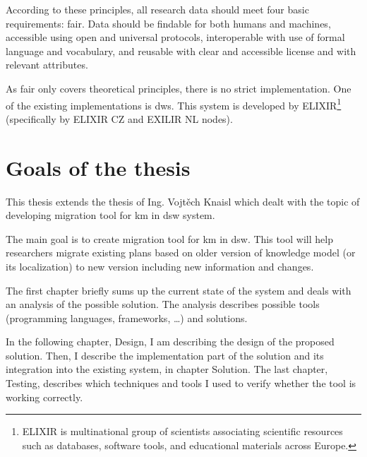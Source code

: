 According to these principles, all research data should meet four basic requirements: \gls{fair}.
Data should be findable for both humans and machines, accessible using open and universal protocols, interoperable with use of formal language and vocabulary, and reusable with clear and accessible license and with relevant attributes.

As \gls{fair} only covers theoretical principles, there is no strict implementation.
One of the existing implementations is \gls{dws}.
This system is developed by ELIXIR\footnote{ELIXIR is multinational group of scientists associating scientific resources such as databases, software tools, and educational materials across Europe.} (specifically by ELIXIR CZ and EXILIR NL nodes).

\section*{Goals of the thesis}

This thesis extends the thesis of Ing. Vojtěch Knaisl which dealt with the topic of developing migration tool for \gls{km} in \gls{dsw} system.

The main goal is to create migration tool for \gls{km} in \gls{dsw}.
This tool will help researchers migrate existing plans based on older version of knowledge model (or its localization) to new version including new information and changes.

\medskip

The first chapter briefly sums up the current state of the system and deals with an analysis of the possible solution.
The analysis describes possible tools (programming languages, frameworks, \dots) and solutions.

In the following chapter, Design, I am describing the design of the proposed solution.
Then, I describe the implementation part of the solution and its integration into the existing system, in chapter Solution.
The last chapter, Testing, describes which techniques and tools I used to verify whether the tool is working correctly.
